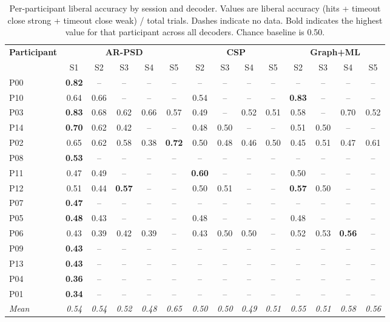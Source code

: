 %
\begin{table}[htbp]
\centering
\small
\caption{Per-participant liberal accuracy by session and decoder. Values are liberal accuracy (hits + timeout close strong + timeout close weak) / total trials. Dashes indicate no data. Bold indicates the highest value for that participant across all decoders. Chance baseline is 0.50.}
\label{tab:session_accuracy}
\begin{tabular}{l|ccccc|cccc|cccc}
\toprule
\textbf{Participant} & \multicolumn{5}{c}{\textbf{AR-PSD}} & \multicolumn{4}{c}{\textbf{CSP}} & \multicolumn{4}{c}{\textbf{Graph+ML}} \\
\cmidrule(lr){2-6} \cmidrule(lr){7-10} \cmidrule(lr){11-14}
 & S1 & S2 & S3 & S4 & S5 & S2 & S3 & S4 & S5 & S2 & S3 & S4 & S5 \\
\midrule
P00 & \textbf{0.82} & -- & -- & -- & -- & -- & -- & -- & -- & -- & -- & -- & -- \\
P10 & 0.64 & 0.66 & -- & -- & -- & 0.54 & -- & -- & -- & \textbf{0.83} & -- & -- & -- \\
P03 & \textbf{0.83} & 0.68 & 0.62 & 0.66 & 0.57 & 0.49 & -- & 0.52 & 0.51 & 0.58 & -- & 0.70 & 0.52 \\
P14 & \textbf{0.70} & 0.62 & 0.42 & -- & -- & 0.48 & 0.50 & -- & -- & 0.51 & 0.50 & -- & -- \\
P02 & 0.65 & 0.62 & 0.58 & 0.38 & \textbf{0.72} & 0.50 & 0.48 & 0.46 & 0.50 & 0.45 & 0.51 & 0.47 & 0.61 \\
P08 & \textbf{0.53} & -- & -- & -- & -- & -- & -- & -- & -- & -- & -- & -- & -- \\
P11 & 0.47 & 0.49 & -- & -- & -- & \textbf{0.60} & -- & -- & -- & 0.50 & -- & -- & -- \\
P12 & 0.51 & 0.44 & \textbf{0.57} & -- & -- & 0.50 & 0.51 & -- & -- & \textbf{0.57} & 0.50 & -- & -- \\
P07 & \textbf{0.47} & -- & -- & -- & -- & -- & -- & -- & -- & -- & -- & -- & -- \\
P05 & \textbf{0.48} & 0.43 & -- & -- & -- & 0.48 & -- & -- & -- & 0.48 & -- & -- & -- \\
P06 & 0.43 & 0.39 & 0.42 & 0.39 & -- & 0.43 & 0.50 & 0.50 & -- & 0.52 & 0.53 & \textbf{0.56} & -- \\
P09 & \textbf{0.43} & -- & -- & -- & -- & -- & -- & -- & -- & -- & -- & -- & -- \\
P13 & \textbf{0.43} & -- & -- & -- & -- & -- & -- & -- & -- & -- & -- & -- & -- \\
P04 & \textbf{0.36} & -- & -- & -- & -- & -- & -- & -- & -- & -- & -- & -- & -- \\
P01 & \textbf{0.34} & -- & -- & -- & -- & -- & -- & -- & -- & -- & -- & -- & -- \\
\midrule
\textit{Mean} & \textit{0.54} & \textit{0.54} & \textit{0.52} & \textit{0.48} & \textit{0.65} & \textit{0.50} & \textit{0.50} & \textit{0.49} & \textit{0.51} & \textit{0.55} & \textit{0.51} & \textit{0.58} & \textit{0.56} \\
\bottomrule
\end{tabular}
\end{table}
